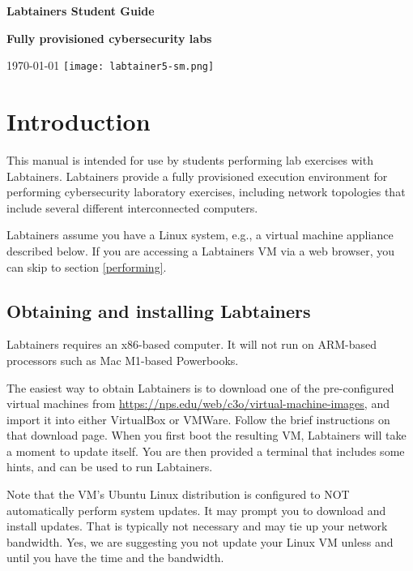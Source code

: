 \documentclass[12pt]{article}
\begin{document}
\begin{titlepage}
\centering
\vfill
\vspace*{4\baselineskip}
{\bfseries\Large
Labtainers Student Guide\par
}
\vspace*{4\baselineskip}
{\bfseries
Fully provisioned cybersecurity labs\par
}
\vspace*{2\baselineskip}
\today
\vfill
\texttt{[image: labtainer5-sm.png]}
\vfill
\end{titlepage}

\section {Introduction}
This manual is intended for use by students performing lab exercises with Labtainers.
Labtainers provide a fully provisioned execution environment for performing
cybersecurity laboratory exercises, including network topologies that include several different
interconnected computers.

Labtainers assume you have a Linux system, e.g., a virtual machine appliance described below.
If you are accessing a Labtainers VM via a web browser, you can skip to section \ref{performing}.

\subsection{Obtaining and installing Labtainers}
Labtainers requires an x86-based computer.  It will not run on ARM-based processors such as 
Mac M1-based Powerbooks.

The easiest way to obtain Labtainers is to download one of the pre-configured virtual machines from
\url{https://nps.edu/web/c3o/virtual-machine-images}, and import it into either VirtualBox or VMWare.
Follow the brief instructions on that download page.  When you first boot the resulting VM,
Labtainers will take a moment to update itself.  You are then provided a terminal that includes
some hints, and can be used to run Labtainers.  

Note that the VM's Ubuntu Linux distribution is configured to NOT
automatically perform system updates.  It may prompt you to download and install updates.  That is typically
not necessary and may tie up your network bandwidth.  Yes, we are suggesting you not update your Linux
VM unless and until you have the time and the bandwidth.
\end{document}
